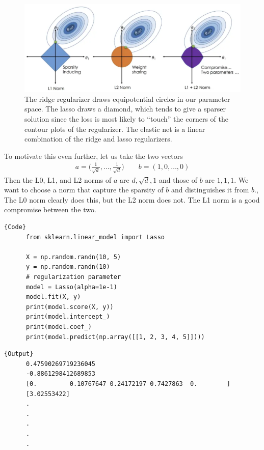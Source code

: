   \begin{figure}[H]
    \centering 
    \includegraphics[scale=0.5]{img/regularizers.png}
    \caption{The ridge regularizer draws equipotential circles in our parameter space. The lasso draws a diamond, which tends to give a sparser solution since the loss is most likely to ``touch'' the corners of the contour plots of the regularizer. The elastic net is a linear combination of the ridge and lasso regularizers.} 
    \label{fig:regularizers_visual}
  \end{figure}

  To motivate this even further, let us take the two vectors 
  \begin{align}
    a = \bigg( \frac{1}{\sqrt{d}}, \ldots, \frac{1}{\sqrt{d}} \bigg) \qquad b = ( 1, 0, \ldots, 0)
  \end{align}
  Then the L0, L1, and L2 norms of $a$ are $d, \sqrt{d}, 1$ and those of $b$ are $1, 1, 1$. We want to choose a norm that capture the sparsity of $b$ and distinguishes it from $b$., The L0 norm clearly does this, but the L2 norm does not. The L1 norm is a good compromise between the two. 

  \begin{code}
    \noindent\begin{minipage}{.6\textwidth}
    \begin{lstlisting}[]{Code}
      from sklearn.linear_model import Lasso

      X = np.random.randn(10, 5) 
      y = np.random.randn(10)
      # regularization parameter
      model = Lasso(alpha=1e-1)  
      model.fit(X, y) 
      print(model.score(X, y))  
      print(model.intercept_)
      print(model.coef_) 
      print(model.predict(np.array([[1, 2, 3, 4, 5]]))) 
    \end{lstlisting}
    \end{minipage}
    \hfill
    \begin{minipage}{.39\textwidth}
    \begin{lstlisting}[]{Output}
      0.47590269719236045
      -0.8861298412689853
      [0.         0.10767647 0.24172197 0.7427863  0.        ]
      [3.02553422]
      .
      .
      .
      .
      .
    \end{lstlisting}
    \end{minipage}
  \end{code}

